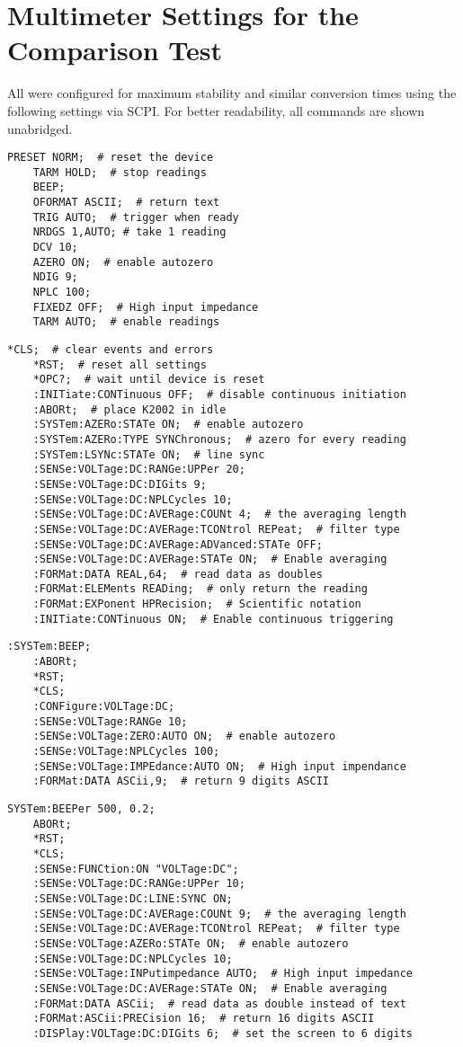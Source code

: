 \documentclass[12pt]{book}
\begin{document}
\section{Multimeter Settings for the Comparison Test}
\label{appendix:dmm_test}
All were configured for maximum stability and similar conversion times using the following settings via SCPI. For better readability, all commands are shown unabridged.

\begin{lstlisting}[title=HP 3458A]
    PRESET NORM;  # reset the device
    TARM HOLD;  # stop readings
    BEEP;
    OFORMAT ASCII;  # return text
    TRIG AUTO;  # trigger when ready
    NRDGS 1,AUTO; # take 1 reading
    DCV 10;
    AZERO ON;  # enable autozero
    NDIG 9;
    NPLC 100;
    FIXEDZ OFF;  # High input impedance
    TARM AUTO;  # enable readings
\end{lstlisting}

\begin{lstlisting}[title=Keithley Model 2002]
    *CLS;  # clear events and errors
    *RST;  # reset all settings
    *OPC?;  # wait until device is reset
    :INITiate:CONTinuous OFF;  # disable continuous initiation
    :ABORt;  # place K2002 in idle
    :SYSTem:AZERo:STATe ON;  # enable autozero
    :SYSTem:AZERo:TYPE SYNChronous;  # azero for every reading
    :SYSTem:LSYNc:STATe ON;  # line sync
    :SENSe:VOLTage:DC:RANGe:UPPer 20;
    :SENSe:VOLTage:DC:DIGits 9;
    :SENSe:VOLTage:DC:NPLCycles 10;
    :SENSe:VOLTage:DC:AVERage:COUNt 4;  # the averaging length
    :SENSe:VOLTage:DC:AVERage:TCONtrol REPeat;  # filter type
    :SENSe:VOLTage:DC:AVERage:ADVanced:STATe OFF;
    :SENSe:VOLTage:DC:AVERage:STATe ON;  # Enable averaging
    :FORMat:DATA REAL,64;  # read data as doubles
    :FORMat:ELEMents READing;  # only return the reading
    :FORMat:EXPonent HPRecision;  # Scientific notation
    :INITiate:CONTinuous ON;  # Enable continuous triggering
\end{lstlisting}

\begin{lstlisting}[title=Keysight 34470A]
    :SYSTem:BEEP;
    :ABORt;
    *RST;
    *CLS;
    :CONFigure:VOLTage:DC;
    :SENSe:VOLTage:RANGe 10;
    :SENSe:VOLTage:ZERO:AUTO ON;  # enable autozero
    :SENSe:VOLTage:NPLCycles 100;
    :SENSe:VOLTage:IMPEdance:AUTO ON;  # High input impendance
    :FORMat:DATA ASCii,9;  # return 9 digits ASCII
\end{lstlisting}

\begin{lstlisting}[title=Keithley DMM6500]
    SYSTem:BEEPer 500, 0.2;
    ABORt;
    *RST;
    *CLS;
    :SENSe:FUNCtion:ON "VOLTage:DC";
    :SENSe:VOLTage:DC:RANGe:UPPer 10;
    :SENSe:VOLTage:DC:LINE:SYNC ON;
    :SENSe:VOLTage:DC:AVERage:COUNt 9;  # the averaging length
    :SENSe:VOLTage:DC:AVERage:TCONtrol REPeat;  # filter type
    :SENSe:VOLTage:AZERo:STATe ON;  # enable autozero
    :SENSe:VOLTage:DC:NPLCycles 10;
    :SENSe:VOLTage:INPutimpedance AUTO;  # High input impedance
    :SENSe:VOLTage:DC:AVERage:STATe ON;  # Enable averaging
    :FORMat:DATA ASCii;  # read data as double instead of text
    :FORMat:ASCii:PRECision 16;  # return 16 digits ASCII
    :DISPlay:VOLTage:DC:DIGits 6;  # set the screen to 6 digits
\end{lstlisting}
\end{document}
